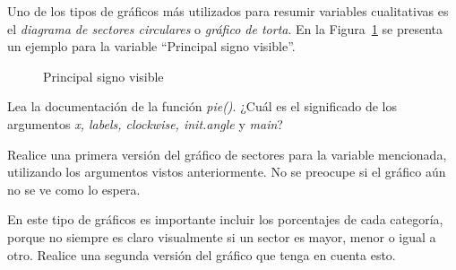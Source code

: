 \documentclass{prob}
\begin{document}
	\begin{problema}
	Uno de los tipos de gráficos más utilizados para resumir variables cualitativas es el \textit{diagrama de sectores circulares} o \textit{gráfico de torta}. En la Figura~\ref{fig:plot01} se presenta un ejemplo para la variable \textquotedblleft Principal signo visible\textquotedblright.\\

\begin{figure}[!ht]
    \centering
    
    \caption{Principal signo visible}
    \label{fig:plot01}
\end{figure}

	\begin{parte}
		Lea la documentación de la función \textit{pie()}. ¿Cuál es el significado de los argumentos \textit{x, labels, clockwise, init.angle} y \textit{main}?
	\end{parte}

	\begin{parte}
		Realice una primera versión del gráfico de sectores para la variable mencionada, utilizando los argumentos vistos anteriormente. No se preocupe si el gráfico aún no se ve como lo espera.
	\end{parte}	
	
	\begin{parte}	
	En este tipo de gráficos es importante incluir los porcentajes de cada categoría, porque no siempre es claro visualmente si un sector es mayor, menor o igual a otro. Realice una segunda versión del gráfico que tenga en cuenta esto.\\		
		
		\noindent{}	
	\end{parte}	
	

\end{problema}
\end{document}

